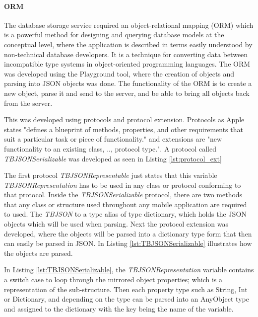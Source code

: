 \paragraph{ORM}

The database storage service required an object-relational mapping (ORM) which is a powerful method for designing and querying database models at the conceptual level, where the application is described in terms easily understood by non-technical database developers. It is a technique for converting data between incompatible type systems in object-oriented programming languages. The ORM was developed using the Playground tool, where the creation of objects and parsing into JSON objects was done. The functionality of the ORM is to create a new object, parse it and send to the server, and be able to bring all objects back from the server.

This was developed using protocols and protocol extension. Protocols as Apple states "defines a blueprint of methods, properties, and other requirements that suit a particular task or piece of functionality." and extensions are "new functionality to an existing class, .., protocol type.". \cite{protocol} A protocol called \textit{TBJSONSerializable} was developed as seen in Listing \ref{lst:protocol_ext}



The first protocol \textit{TBJSONRepresentable} just states that this variable \textit{TBJSONRepresentation} has to be used in any class or protocol conforming to that protocol. Inside the \textit{TBJSONSerializable} protocol, there are two methods that any class or structure used throughout any mobile application are required to used. The \textit{TBJSON} to a type alias of type dictionary, which holds the JSON objects which will be used when parsing. Next the protocol extension was developed, where the objects will be parsed into a dictionary type form that then can easily be parsed in JSON. In Listing \ref{lst:TBJSONSerializable} illustrates how the objects are parsed.



In Listing \ref{lst:TBJSONSerializable}, the \textit{TBJSONRepresentation} variable contains a switch case to loop through the mirrored object properties; which is a representation of the sub-structure. Then each property type such as String, Int or Dictionary, and depending on the type can be parsed into an AnyObject type and assigned to the dictionary with the key being the name of the variable.


